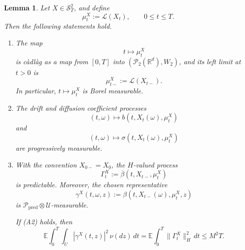 \documentclass[12pt,oneside, reqno]{amsart}
\newtheorem{lemma}[theorem]{Lemma}
\numberwithin{equation}{section}
\begin{document}
	
	\begin{lemma}
		\label{lem-Measurability}
		Let \(X\in\mathcal S_T^2\), and define
		\[
		\mu_t^X:=\mathcal L(X_t), \qquad 0\le t\le T.
		\]
		Then the following statements hold.
		
		\begin{enumerate}
			\item[\textnormal{(i)}]
			The map
			\[
			t\longmapsto \mu_t^X
			\]
			is c\`adl\`ag as a map from \([0,T]\) into \((\mathcal P_2(\mathbb R^d),W_2)\), and its left limit at \(t>0\) is
			\[
			\mu_{t-}^X:=\mathcal L(X_{t-}).
			\]
			In particular, \(t\mapsto \mu_t^X\) is Borel measurable.
			
			\item[\textnormal{(ii)}]
			The drift and diffusion coefficient processes
			\[
			(t,\omega)\longmapsto b(t,X_t(\omega),\mu_t^X)
			\]
			and
			\[
			(t,\omega)\longmapsto \sigma(t,X_t(\omega),\mu_t^X)
			\]
			are progressively measurable.
			
			\item[\textnormal{(iii)}]
			With the convention \(X_{0-}=X_0\), the \(H\)-valued process
			\[
			\Gamma_t^X := \overline\beta(t,X_{t-},\mu_t^X)
			\]
			is predictable. Moreover, the chosen representative
			\[
			\gamma^X(t,\omega,z) := \beta(t,X_{t-}(\omega),\mu_t^X,z)
			\]
			is \(\mathcal P_{\mathrm{pred}}\otimes\mathcal U\)-measurable.
			
			If \textnormal{(A2)} holds, then
			\[
			\mathbb E\int_0^T\int_U |\gamma^X(t,z)|^2\,\nu(dz)\,dt
			=\mathbb E\int_0^T \|\Gamma_t^X\|_H^2\,dt
			\le M^2T.
			\]
		\end{enumerate}
	\end{lemma}
	
\end{document}
